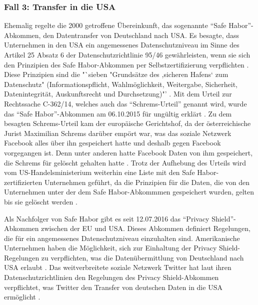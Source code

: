 \subsubsection{Fall 3: Transfer in die USA}
Ehemalig regelte die 2000 getroffene Übereinkunft, das sogenannte "`Safe Habor"'-Abkommen, den Datentransfer von Deutschland nach USA. Es besagte, dass Unternehmen in den USA ein angemessenes Datenschutzniveau im Sinne des Artikel 25 Absatz 6 der Datenschutzrichtlinie 95/46 gewährleisten, wenn sie sich den Prinzipien des Safe Habor-Abkommen per Selbstzertifizierung verpflichten \autocite[vgl.][]{BDFI.2017}. Diese Prinzipien sind die "`sieben "Grundsätze des ,sicheren Hafens‘ zum Datenschutz"  (Informationspflicht, Wahlmöglichkeit, Weitergabe, Sicherheit, Datenintegrität, Auskunftsrecht und Durchsetzung)"' \autocite[][]{BDFI.2017}. Mit dem Urteil zur Rechtssache C-362/14, welches auch das "`Schrems-Urteil"' genannt wird, wurde das "`Safe Habor"'-Abkommen am 06.10.2015 für ungültig erklärt \autocite[vgl.][]{BDFI.2017}. Zu dem besagten Schrems-Urteil kam der europäische Gerichtshof, da der österreichische Jurist Maximilian Schrems darüber empört war, was das soziale Netzwerk Facebook alles über ihn gespeichert hatte und deshalb gegen Facebook vorgegangen ist. Denn unter anderen hatte Facebook Daten von ihm gespeichert, die Schrems für gelöscht gehalten hatte \autocite[vgl.][]{Welt.2015}. Trotz der Aufhebung des Urteils wird vom US-Handelsministerium weiterhin eine Liste mit den Safe Habor-zertifizierten Unternehmen geführt, da die Prinzipien für die Daten, die von den Unternehmen unter der dem Safe Habor-Abkommmen gespeichert wurden, gelten bis sie gelöscht werden \autocite[vgl.][]{BDFI.2017}.
\par
Als Nachfolger von Safe Habor gibt es seit 12.07.2016 das "`Privacy Shield"'-Abkommen zwischen der \ac{EU} und USA. Dieses Abkommen definiert Regelungen, die für ein angemessenes Datenschutzniveau einzuhalten sind. Amerikanische Unternehmen haben die Möglichkeit, sich zur Einhaltung der Privacy Shield-Regelungen zu verpflichten, was die Datenübermittlung von Deutschland nach USA erlaubt \autocite[vgl.][]{LDI.2017}. Das weitverbreitete soziale Netzwerk Twitter hat laut ihren Datenschutzrichtlinien den Regelungen des Privacy Shield-Abkommen verpflichtet, was Twitter den Transfer von deutschen Daten in die USA ermöglicht \autocite[vgl.][]{TwitterInc..2017}.

